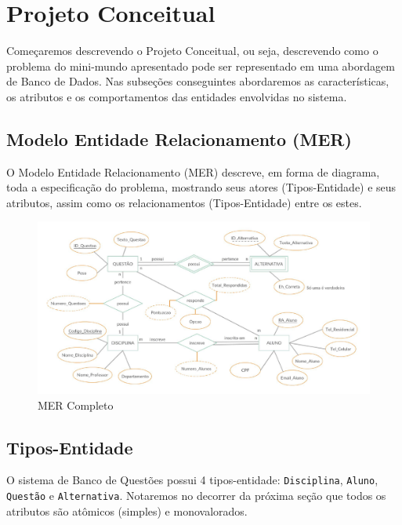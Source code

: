 \documentclass[12pt,a4paper]{article}
\begin{document}
\section{Projeto Conceitual}

Começaremos descrevendo o Projeto Conceitual, ou seja, descrevendo como o problema do mini-mundo apresentado pode ser representado em uma abordagem de Banco de Dados. Nas subseções conseguintes abordaremos as características, os atributos e os comportamentos das entidades envolvidas no sistema.

\subsection{Modelo Entidade Relacionamento (MER)}

O Modelo Entidade Relacionamento (MER) descreve, em forma de diagrama, toda a especificação do problema, mostrando seus atores (Tipos-Entidade) e seus atributos, assim como os relacionamentos (Tipos-Entidade) entre os estes.

\begin{center}
\begin{figure}[h]
    \centering
    \includegraphics[width=\linewidth]{diagramaProjeto.jpg}
    \caption{MER Completo}
    \label{fig:DERcompleto}
\end{figure}
\end{center}

\subsection{Tipos-Entidade}

O sistema de Banco de Questões possui 4 tipos-entidade: {\texttt{Disciplina}}, {\texttt{Aluno}}, {\texttt{Questão}} e {\texttt{Alternativa}}. Notaremos no decorrer da próxima seção que todos os atributos são atômicos (simples) e monovalorados.
\end{document}
